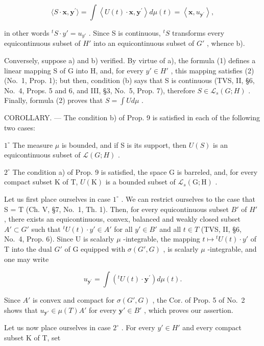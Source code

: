\[
\langle S \cdot \mathbf {x}, \mathbf {y} ^ {\prime} \rangle = \int \left\langle U (t) \cdot \mathbf {x}, \mathbf {y} ^ {\prime} \right\rangle d \mu (t) = \left\langle \mathbf {x}, u _ {\mathbf {y} ^ {\prime}} \right\rangle ,\tag{2}
\]

in other words \(^{t}S \cdot y' = u_{y'}\) . Since S is continuous, \(^{t}S\) transforms every equicontinuous subset of \(H'\) into an equicontinuous subset of \(G'\) , whence b).

Conversely, suppose a) and b) verified. By virtue of a), the formula (1) defines a linear mapping S of G into H, and, for every \(y' \in H'\) , this mapping satisfies (2) (No.~1, Prop. 1); but then, condition (b) says that S is continuous (TVS, II, §6, No.~4, Props. 5 and 6, and III, §3, No.~5, Prop. 7), therefore \(S \in \mathcal{L}_{s}(G;H)\) . Finally, formula (2) proves that \(S = \int U d\mu\) .

COROLLARY. --- The condition b) of Prop. 9 is satisfied in each of the following two cases:

\(1^{\circ}\) The measure \(\mu\) is bounded, and if S is its support, then \(U(S)\) is an equicontinuous subset of \(\mathcal{L}(G;H)\) .

\(2^{\circ}\) The condition a) of Prop. 9 is satisfied, the space G is barreled, and, for every compact subset K of T, \(U(\mathrm{K})\) is a bounded subset of \(\mathcal{L}_s(\mathrm{G};\mathrm{H})\) .

Let us first place ourselves in case \(1^{\circ}\) . We can restrict ourselves to the case that S = T (Ch. V, §7, No.~1, Th. 1). Then, for every equicontinuous subset \(B'\) of \(H'\) , there exists an equicontinuous, convex, balanced and weakly closed subset \(A' \subset G'\) such that \({}^{t}U(t) \cdot y' \in A'\) for all \(y' \in B'\) and all \(t \in T\) (TVS, II, §6, No.~4, Prop. 6). Since U is scalarly \(\mu\) -integrable, the mapping \(t \mapsto {}^{t}U(t) \cdot y'\) of T into the dual \(G'\) of G equipped with \(\sigma(G', G)\) , is scalarly \(\mu\) -integrable, and one may write

\[
u _ {\mathbf {y} ^ {\prime}} = \int \left(^ {t} U (t) \cdot \mathbf {y} ^ {\prime}\right) d \mu (t).
\]

Since \(A'\) is convex and compact for \(\sigma(G', G)\) , the Cor. of Prop. 5 of No.~2 shows that \(u_{\mathbf{y}'} \in \mu(T)A'\) for every \(\mathbf{y}' \in B'\) , which proves our assertion.

Let us now place ourselves in case \(2^{\circ}\) . For every \(y' \in H'\) and every compact subset K of T, set

